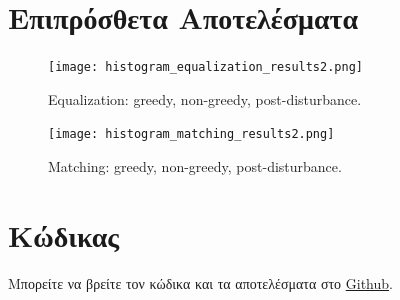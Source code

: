 \documentclass{article}
\begin{document}
\section{Επιπρόσθετα Αποτελέσματα}
\begin{figure}[H]
  \centering
  \texttt{[image: histogram\_equalization\_results2.png]}
  \caption{Equalization: greedy, non-greedy, post-disturbance.}
  \label{fig:eq}
\end{figure}

\begin{figure}[H]
  \centering
  \texttt{[image: histogram\_matching\_results2.png]}
  \caption{Matching: greedy, non-greedy, post-disturbance.}
  \label{fig:match}
\end{figure}

\section{Κώδικας}
Μπορείτε να βρείτε τον κώδικα και τα αποτελέσματα στο \href{https://github.com/charisvt/dip-hw1}{Github}.
\end{document}
